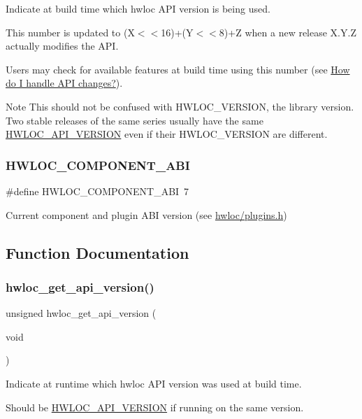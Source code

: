 Indicate at build time which hwloc A\+PI version is being used. 

This number is updated to (X$<$$<$16)+(Y$<$$<$8)+Z when a new release X.\+Y.\+Z actually modifies the A\+PI.

Users may check for available features at build time using this number (see \hyperlink{a00394_faq_version_api}{How do I handle A\+PI changes?}).

\begin{DoxyNote}{Note}
This should not be confused with H\+W\+L\+O\+C\+\_\+\+V\+E\+R\+S\+I\+ON, the library version. Two stable releases of the same series usually have the same \hyperlink{a00182_ga8f4dfb8eef138af55dd1a0fa802e5476}{H\+W\+L\+O\+C\+\_\+\+A\+P\+I\+\_\+\+V\+E\+R\+S\+I\+ON} even if their H\+W\+L\+O\+C\+\_\+\+V\+E\+R\+S\+I\+ON are different. 
\end{DoxyNote}
\mbox{\label{a00182_gaac5bc1f46f55e10ef0141a68ce70e21f}} 
\subsubsection{\texorpdfstring{H\+W\+L\+O\+C\+\_\+\+C\+O\+M\+P\+O\+N\+E\+N\+T\+\_\+\+A\+BI}{HWLOC\_COMPONENT\_ABI}}
{\footnotesize\ttfamily \#define H\+W\+L\+O\+C\+\_\+\+C\+O\+M\+P\+O\+N\+E\+N\+T\+\_\+\+A\+BI~7}



Current component and plugin A\+BI version (see \hyperlink{a00176_source}{hwloc/plugins.\+h}) 



\subsection{Function Documentation}
\mbox{\label{a00182_ga9c0b50c98add1adf57ed1ce85bb5190d}} 
\subsubsection{\texorpdfstring{hwloc\+\_\+get\+\_\+api\+\_\+version()}{hwloc\_get\_api\_version()}}
{\footnotesize\ttfamily unsigned hwloc\+\_\+get\+\_\+api\+\_\+version (\begin{DoxyParamCaption}\item[{void}]{ }\end{DoxyParamCaption})}



Indicate at runtime which hwloc A\+PI version was used at build time. 

Should be \hyperlink{a00182_ga8f4dfb8eef138af55dd1a0fa802e5476}{H\+W\+L\+O\+C\+\_\+\+A\+P\+I\+\_\+\+V\+E\+R\+S\+I\+ON} if running on the same version. 